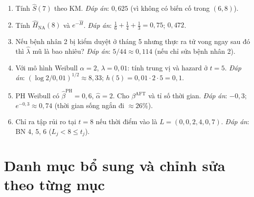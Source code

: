 \documentclass[11pt,a4paper,notitlepage]{report}
\begin{document}
\begin{bosung}
\begin{enumerate}[leftmargin=1.6em,itemsep=2pt]
\item Tính $\hat S(7)$ theo KM. \emph{Đáp án}: $0{,}625$ (vì không có biến cố trong $(6,8)$).
\item Tính $\hat H_{\mathrm{NA}}(8)$ và $e^{-\hat H}$. \emph{Đáp án}: $\tfrac16+\tfrac14+\tfrac13=0{,}75$; $0{,}472$.
\item Nếu bệnh nhân 2 bị kiểm duyệt ở tháng 5 nhưng thực ra tử vong ngay sau đó thì $\hat\lambda$ mũ là bao nhiêu? \emph{Đáp án}: $5/44\approx0{,}114$ (nếu chỉ sửa bệnh nhân 2).
\item Với mô hình Weibull $\alpha=2$, $\lambda=0{,}01$: tính trung vị và hazard ở $t=5$. \emph{Đáp án}: $(\log2/0{,}01)^{1/2}\approx8{,}33$; $h(5)=0{,}01\cdot2\cdot5=0{,}1$.
\item PH Weibull có $\hat\beta^{\mathrm{PH}}=0{,}6$, $\hat\alpha=2$. Cho $\beta^{\mathrm{AFT}}$ và tỉ số thời gian. \emph{Đáp án}: $-0{,}3$; $e^{-0{,}3}\approx0{,}74$ (thời gian sống ngắn đi $\approx26\%$).
\item Chỉ ra tập rủi ro tại $t=8$ nếu thời điểm vào là $L=(0,0,2,4,0,7)$. \emph{Đáp án}: BN 4, 5, 6 ($L_j<8\le t_j$).
\end{enumerate}
\end{bosung}

\appendix
\chapter{Danh mục bổ sung và chỉnh sửa theo từng mục}
\end{document}
